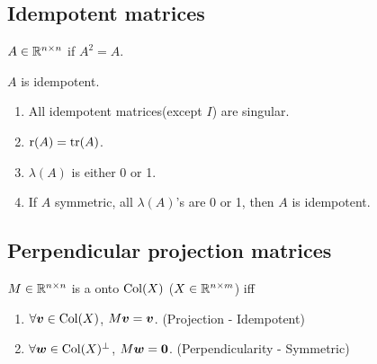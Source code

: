 \documentclass[10pt,a4paper]{book}
\begin{document}
\subsection{Idempotent matrices}\label{sec:idempotent}
\begin{defbox}
	\begin{definition}\label{def:idempotent}
		$A\in\mathbb R^{n\times n}$ if $A^2=A$.  
	\end{definition}
\end{defbox}

\begin{thmbox}
	\begin{theorem}\label{thm:idempotent}
		$A$ is idempotent.  
		\begin{enumerate}
			\item All idempotent matrices(except $I$) are singular.
			\item $\mathrm{r}(A)=\mathrm{tr}(A)$. 
			\item $\lambda(A)$ is either 0 or 1. 
			\item If $A$ symmetric, all $\lambda(A)$'s are 0 or 1, then $A$ is idempotent. 
		\end{enumerate}
	\end{theorem}
\end{thmbox}

\subsection{Perpendicular projection matrices}\label{sec:ppm}
\begin{defbox}
	\begin{definition}\label{def:ppm}
		$M\in\mathbb R^{n\times n}$ is a  onto $\mathrm{Col}(X)$ ($X\in\mathbb R^{n\times m}$) iff 
		\begin{enumerate}
			\item $\forall {\boldsymbol v}\in\mathrm{Col}(X)$, $M{\boldsymbol v}={\boldsymbol v}$. (Projection - Idempotent)
			\item $\forall {\boldsymbol w}\in\mathrm{Col}(X)^{\perp}$, $M{\boldsymbol w}={\boldsymbol 0}$. (Perpendicularity - Symmetric)  
		\end{enumerate}  
	\end{definition}
\end{defbox}
\end{document}
